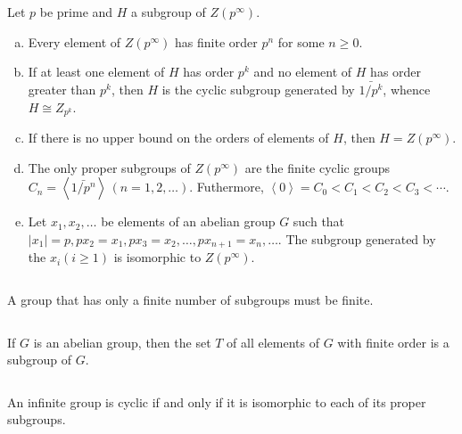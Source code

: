 $$ $$

\begin{ex}
    Let $p$ be prime and $H$ a subgroup of $Z(p^{\infty})$.
    \begin{enumerate}[(a)]
        \item Every element of $Z(p^{\infty})$ has finite order $p^{n}$ for some $n\geq 0$.
        \item If at least one element of $H$ has order $p^{k}$ and no element of $H$ has order greater than $p^{k}$, then $H$ is the cyclic subgroup generated by $\bar{1/p^{k}}$, whence $H\cong Z_{p^{k}}$.
        \item If there is no upper bound on the orders of elements of $H$, then $H=Z(p^{\infty})$.
        \item The only proper subgroups of $Z(p^{\infty})$ are the finite cyclic groups $C_{n}=\left\langle\bar{1/p^{n}}\right\rangle\,(n=1,2,\dots)$. Futhermore, $\left\langle0\right\rangle=C_{0}<C_{1}<C_{2}<C_{3}<\cdots$.
        \item Let $x_{1},x_{2},\dots$ be elements of an abelian group $G$ such that $\left| x_{1} \right| =p, px_{2}=x_{1},px_{3}=x_{2},\dots,px_{n+1}=x_{n},\dots$. The subgroup generated by the $x_{i}(i\geq 1)$ is isomorphic to $Z(p^{\infty})$. 
    \end{enumerate}
\end{ex}

$$ $$

\begin{ex}
    A group that has only a finite number of subgroups must be finite.
\end{ex}

$$ $$

\begin{ex}
    If $G$ is an abelian group, then the set $T$ of all elements of $G$ with finite order is a subgroup of $G$.
\end{ex}

$$ $$

\begin{ex}
    An infinite group is cyclic if and only if it is isomorphic to each of its proper subgroups.
\end{ex}